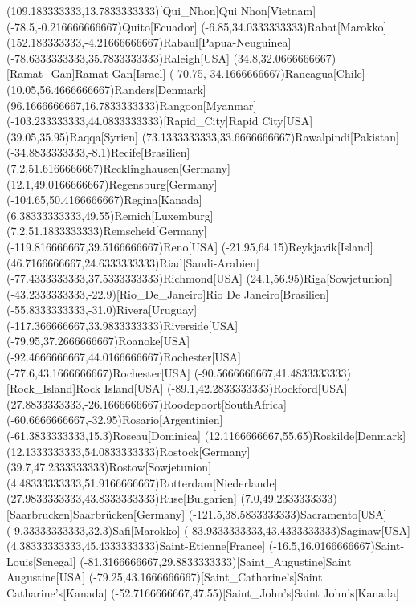 \mapput(109.183333333,13.7833333333)[Qui_Nhon]{Qui Nhon}[Vietnam]
\mapput(-78.5,-0.216666666667){Quito}[Ecuador]
\mapput(-6.85,34.0333333333){Rabat}[Marokko]
\mapput(152.183333333,-4.21666666667){Rabaul}[Papua-Neuguinea]
\mapput(-78.6333333333,35.7833333333){Raleigh}[USA]
\mapput(34.8,32.0666666667)[Ramat_Gan]{Ramat Gan}[Israel]
\mapput(-70.75,-34.1666666667){Rancagua}[Chile]
\mapput(10.05,56.4666666667){Randers}[Denmark]
\mapput(96.1666666667,16.7833333333){Rangoon}[Myanmar]
\mapput(-103.233333333,44.0833333333)[Rapid_City]{Rapid City}[USA]
\mapput(39.05,35.95){Raqqa}[Syrien]
\mapput(73.1333333333,33.6666666667){Rawalpindi}[Pakistan]
\mapput(-34.8833333333,-8.1){Recife}[Brasilien]
\mapput(7.2,51.6166666667){Recklinghausen}[Germany]
\mapput(12.1,49.0166666667){Regensburg}[Germany]
\mapput(-104.65,50.4166666667){Regina}[Kanada]
\mapput(6.38333333333,49.55){Remich}[Luxemburg]
\mapput(7.2,51.1833333333){Remscheid}[Germany]
\mapput(-119.816666667,39.5166666667){Reno}[USA]
\mapput(-21.95,64.15){Reykjavik}[Island]
\mapput(46.7166666667,24.6333333333){Riad}[Saudi-Arabien]
\mapput(-77.4333333333,37.5333333333){Richmond}[USA]
\mapput(24.1,56.95){Riga}[Sowjetunion]
\mapput(-43.2333333333,-22.9)[Rio_De_Janeiro]{Rio De Janeiro}[Brasilien]
\mapput(-55.8333333333,-31.0){Rivera}[Uruguay]
\mapput(-117.366666667,33.9833333333){Riverside}[USA]
\mapput(-79.95,37.2666666667){Roanoke}[USA]
\mapput(-92.4666666667,44.0166666667){Rochester}[USA]
\mapput(-77.6,43.1666666667){Rochester}[USA]
\mapput(-90.5666666667,41.4833333333)[Rock_Island]{Rock Island}[USA]
\mapput(-89.1,42.2833333333){Rockford}[USA]
\mapput(27.8833333333,-26.1666666667){Roodepoort}[SouthAfrica]
\mapput(-60.6666666667,-32.95){Rosario}[Argentinien]
\mapput(-61.3833333333,15.3){Roseau}[Dominica]
\mapput(12.1166666667,55.65){Roskilde}[Denmark]
\mapput(12.1333333333,54.0833333333){Rostock}[Germany]
\mapput(39.7,47.2333333333){Rostow}[Sowjetunion]
\mapput(4.48333333333,51.9166666667){Rotterdam}[Niederlande]
\mapput(27.9833333333,43.8333333333){Ruse}[Bulgarien]
\mapput(7.0,49.2333333333)[Saarbrucken]{Saarbrücken}[Germany]
\mapput(-121.5,38.5833333333){Sacramento}[USA]
\mapput(-9.33333333333,32.3){Safi}[Marokko]
\mapput(-83.9333333333,43.4333333333){Saginaw}[USA]
\mapput(4.38333333333,45.4333333333){Saint-Etienne}[France]
\mapput(-16.5,16.0166666667){Saint-Louis}[Senegal]
\mapput(-81.3166666667,29.8833333333)[Saint_Augustine]{Saint Augustine}[USA]
\mapput(-79.25,43.1666666667)[Saint_Catharine's]{Saint Catharine's}[Kanada]
\mapput(-52.7166666667,47.55)[Saint_John's]{Saint John's}[Kanada]
